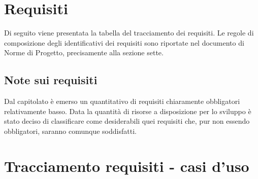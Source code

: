





\newpage
\section{Requisiti}
\label{4.0}
Di seguito viene presentata la tabella del tracciamento dei requisiti. Le regole di composizione degli identificativi dei requisiti sono riportate nel documento di Norme di Progetto, precisamente alla sezione sette.




\subsection{Note sui requisiti}
Dal capitolato è emerso un quantitativo di requisiti chiaramente obbligatori relativamente basso. Data la quantità di risorse a disposizione per lo sviluppo è stato deciso di classificare come desiderabili quei requisiti che, pur non essendo obbligatori, saranno comunque soddisfatti.
\newpage
\section{Tracciamento requisiti - casi d'uso}
\label{5.0}





